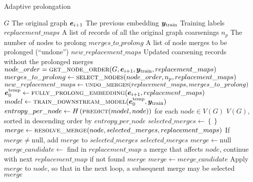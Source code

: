 \begin{algorithm}
  \caption{Adaptive prolongation}
  \label{alg:adaptive-prolongation}
  \begin{algorithmic}
    \Require $ G $ \Comment The original graph
    \Require $ \bm{e}_{i+1} $ \Comment The previous embedding
    \Require $ \bm{y}_\mathrm{train} $ \Comment Training labels
    \Require $ replacement\_maps $ \Comment A list of records of all the original graph coarsenings
    \Require $ n_p $ \Comment The number of nodes to prolong
    \Ensure $ merges\_to\_prolong $ \Comment A list of node merges to be prolonged (\enquote{undone})
    \Ensure $ new\_replacement\_maps $ \Comment Updated coarsening records without the prolonged merges
    \Statex
    \State $ node\_order = \Call{get\_node\_order}{G, \bm{e}_{i+1}, \bm{y}_\mathrm{train}, replacement\_maps} $
    \State $ merges\_to\_prolong \gets \Call{select\_nodes}{node\_order, n_p, replacement\_maps} $
    \State $ new\_replacement\_maps \gets \Call{undo\_merges}{replacement\_maps, merges\_to\_prolong} $
    \Statex
        \State $ \bm{e}_0^\mathrm{temp} \gets \Call{fully\_prolong\_embedding}{\bm{e}_{i+1}, replacement\_maps} $
        \State $ model \gets \Call{train\_downstream\_model}{\bm{e}_0^\mathrm{temp}, \bm{y}_\mathrm{train}} $
        \State $ entropy\_per\_node \gets H \left( \Call{predict}{model, node} \right) $ for each $ node \in V \left( G \right) $
        \State \Return $ V \left( G \right) $, sorted in descending order by $ entropy\_per\_node $
    \EndFunction
    \Statex
        \State $ selected\_merges \gets \left\{ \right\} $
            \State $ merge \gets \Call{resolve\_merge}{node, selected\_merges, replacement\_maps} $
            \State If $ merge \neq \mathrm{null} $, add $ merge $ to $ selected\_merges $
        \EndFor
        \State \Return $ selected\_merges $
    \EndFunction
    \Statex
        \State $ merge \gets \mathrm{null} $
            \State $ merge\_candidate \gets $ find in $ replacement\_map $ a merge that affects $ node $, continue with next $ replacement\_map $ if not found
                \State \Return $ merge $
            \EndIf
            \State $ merge \gets merge\_candidate $
            \State Apply $ merge $ to $ node $, so that in the next loop, a subsequent merge may be selected
        \EndFor
        \State \Return $ merge $
    \EndFunction
  \end{algorithmic}
\end{algorithm}

